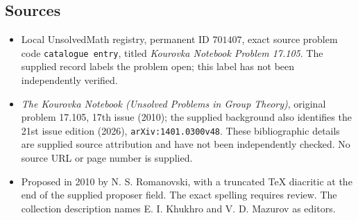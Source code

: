 \documentclass[11pt]{article}
\begin{document}
\subsection{Sources}
\begin{itemize}
\item Local UnsolvedMath registry, permanent ID \(701407\), exact source problem code \texttt{catalogue entry}, titled \emph{Kourovka Notebook Problem 17.105}. The supplied record labels the problem open; this label has not been independently verified.
\item \emph{The Kourovka Notebook (Unsolved Problems in Group Theory)}, original problem 17.105, 17th issue (2010); the supplied background also identifies the 21st issue edition (2026), \texttt{arXiv:1401.0300v48}. These bibliographic details are supplied source attribution and have not been independently checked. No source URL or page number is supplied.
\item Proposed in 2010 by N. S. Romanovski, with a truncated TeX diacritic at the end of the supplied proposer field. The exact spelling requires review. The collection description names E. I. Khukhro and V. D. Mazurov as editors.
\end{itemize}
\end{document}
